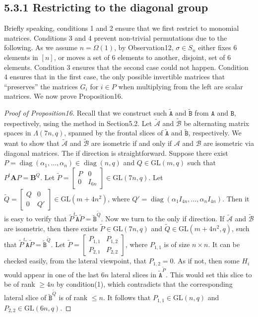 \subsection*{5.3.1 Restricting to the diagonal group}
Briefly speaking, conditions 1 and 2 ensure that we first restrict to monomial matrices. Conditions 3 and 4 prevent non-trivial permutations due to the following. As we assume $n=\Omega(1)$, by Observation12, $\sigma\in S_n$ either fixes 6 elements in $[n]$, or moves a set of 6 elements to another, disjoint, set of 6 elements. Condition 3 ensures that the second case could not happen. Condition 4 ensures that in the first case, the only possible invertible matrices that ``preserves'' the matrices $G_i$ for $i\in P$ when multiplying from the left are scalar matrices.
We now prove Proposition16.
\begin{proof}[Proof of Proposition16]
Recall that we construct such $\widetilde{\mathtt A}$ and $\widetilde{\mathtt B}$ from $\mathtt A$ and $\mathtt B$, respectively, using the method in Section5.2. Let $\widetilde{\mathcal A}$ and $\widetilde{\mathcal B}$ be alternating matrix spaces in $\Lambda(7n,q)$, spanned by the frontal slices of $\widetilde{\mathtt A}$ and $\widetilde{\mathtt B}$, respectively.
We want to show that $\widetilde{\mathcal A}$ and $\widetilde{\mathcal B}$ are isometric if and only if $\mathcal A$ and $\mathcal B$ are isometric via diagonal matrices. The if direction is straightforward. Suppose there exist $P=\operatorname{diag}(\alpha_1,\ldots,\alpha_n)\in\operatorname{diag}(n,q)$ and $Q\in\mathrm{GL}(m,q)$ such that $P^t\mathbf A P=\mathbf B^Q$. Let $\widetilde P=\begin{bmatrix}P&0\\0&I_{6n}\end{bmatrix}\in\mathrm{GL}(7n,q)$. Let $\widetilde Q=\begin{bmatrix}Q&0\\0&Q'\end{bmatrix}\in\mathrm{GL}(m+4n^2)$, where $Q'=\operatorname{diag}(\alpha_1I_{4n},\ldots,\alpha_nI_{4n})$. Then it is easy to verify that $\widetilde P^t\widetilde{\mathtt A}\widetilde P=\widetilde{\mathtt B}^{\widetilde Q}$.
Now we turn to the only if direction. If $\widetilde{\mathcal A}$ and $\widetilde{\mathcal B}$ are isometric, then there exists $\widetilde P\in\mathrm{GL}(7n,q)$ and $\widetilde Q\in\mathrm{GL}(m+4n^2,q)$, such that $\widetilde P^t\widetilde{\mathtt A}\widetilde P=\widetilde{\mathtt B}^{\widetilde Q}$. Let $\widetilde P=\begin{bmatrix}P_{1,1}&P_{1,2}\\P_{2,1}&P_{2,2}\end{bmatrix}$, where $P_{1,1}$ is of size $n\times n$. It can be checked easily, from the lateral viewpoint, that $P_{1,2}=0$. As if not, then some $H_i$ would appear in one of the last $6n$ lateral slices in $\widetilde{\mathtt A}^{\widetilde P}$. This would set this slice to be of rank $\ge4n$ by condition(1), which contradicts that the corresponding lateral slice of $\widetilde{\mathtt B}^{\widetilde Q}$ is of rank $\le n$. It follows that $P_{1,1}\in\mathrm{GL}(n,q)$ and $P_{2,2}\in\mathrm{GL}(6n,q)$.

\end{proof}
